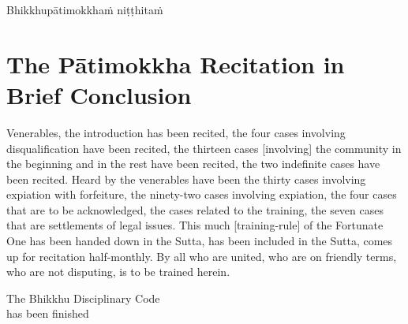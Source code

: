 \begin{outro}
	Bhikkhupātimokkhaṁ niṭṭhitaṁ
\end{outro}

\clearpage



\section{The Pātimokkha Recitation in Brief Conclusion}
\label{patimokkha-in-brief-conclusion}

\ifafiveversion\vspace{0.15cm}\fi
\ifninebythirteenversion\vspace{0.15cm}\fi

Venerables, the introduction has been recited, the four cases involving disqualification have been recited, the thirteen cases [involving] the community in the beginning and in the rest have been recited, the two indefinite cases have been recited. Heard by the venerables have been the thirty cases involving expiation with forfeiture, the ninety-two cases involving expiation, the four cases that are to be acknowledged, the cases related to the training, the seven cases that are settlements of legal issues. This much [training-rule] of the Fortunate One has been handed down in the Sutta, has been included in the Sutta, comes up for recitation half-monthly. By all who are united, who are on friendly terms, who are not disputing, is to be trained herein.

\begin{outro}
	The Bhikkhu Disciplinary Code \ifninebythirteenversion\\\fi has been finished
\end{outro}

\clearpage


